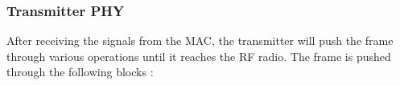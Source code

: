﻿\documentclass[10pt]{article}
\begin{document}
\subsubsection{Transmitter PHY}
After receiving the signals from the MAC, the transmitter will push the frame through various operations until it reaches the RF radio. 
The frame is pushed through the following blocks :
%
% 
% 
% 
% 
% 
% 
\end{document}
